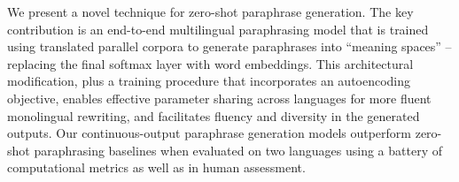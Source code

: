 We present a novel technique for zero-shot paraphrase generation. The key contribution is an end-to-end multilingual paraphrasing model that is trained using translated parallel corpora to generate paraphrases into ``meaning spaces'' -- replacing the final softmax layer with word embeddings. This architectural modification, plus a training procedure that incorporates an autoencoding objective, enables effective parameter sharing across languages for more fluent monolingual rewriting, and facilitates fluency and diversity in the generated outputs. Our continuous-output paraphrase generation models outperform zero-shot paraphrasing baselines when evaluated on two languages using a battery of computational metrics as well as in human assessment.
